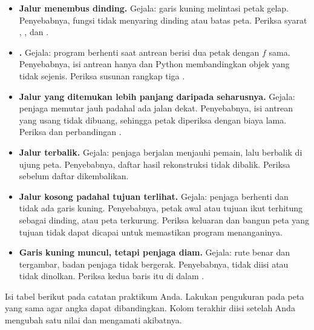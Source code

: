 \begin{galatbox}
\begin{itemize}[leftmargin=1.4em, itemsep=0.35em]
  \item \textbf{Jalur menembus dinding.}
        Gejala: garis kuning melintasi petak gelap. Penyebabnya, fungsi
         tidak menyaring dinding atau batas peta. Periksa
        syarat , , dan
        .
  \item \textbf{.}
        Gejala: program berhenti saat antrean berisi dua petak dengan $f$
        sama. Penyebabnya, isi antrean hanya  dan Python
        membandingkan objek yang tidak sejenis. Periksa susunan rangkap tiga
        .
  \item \textbf{Jalur yang ditemukan lebih panjang daripada seharusnya.}
        Gejala: penjaga memutar jauh padahal ada jalan dekat. Penyebabnya,
        isi antrean yang usang tidak dibuang, sehingga petak diperiksa
        dengan biaya lama. Periksa  dan perbandingan
        .
  \item \textbf{Jalur terbalik.}
        Gejala: penjaga berjalan menjauhi pemain, lalu berbalik di ujung
        peta. Penyebabnya, daftar hasil rekonstruksi tidak dibalik. Periksa
         sebelum daftar dikembalikan.
  \item \textbf{Jalur kosong padahal tujuan terlihat.}
        Gejala: penjaga berhenti dan tidak ada garis kuning. Penyebabnya,
        petak awal atau tujuan ikut terhitung sebagai dinding, atau peta
        terkurung. Periksa keluaran  dan bangun peta yang
        tujuan tidak dapat dicapai untuk memastikan program menanganinya.
  \item \textbf{Garis kuning muncul, tetapi penjaga diam.}
        Gejala: rute benar dan tergambar, badan penjaga tidak bergerak.
        Penyebabnya,  tidak diisi atau 
        tidak dinolkan. Periksa kedua baris itu di dalam .
\end{itemize}
\end{galatbox}


Isi tabel berikut pada catatan praktikum Anda. Lakukan pengukuran pada peta
yang sama agar angka dapat dibandingkan. Kolom terakhir diisi setelah Anda
mengubah satu nilai dan mengamati akibatnya.


